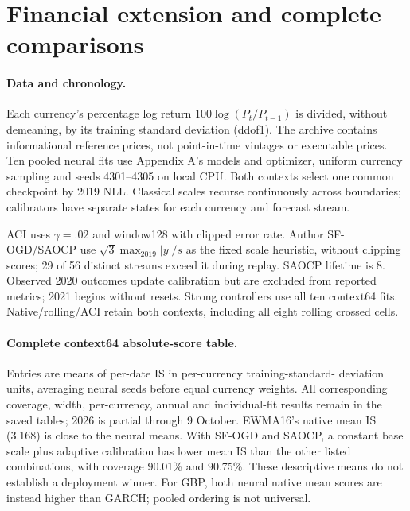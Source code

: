 \documentclass{article}
\begin{document}
\clearpage
\section{Financial extension and complete comparisons}
\paragraph{Data and chronology.}
Each currency's percentage log return $100\log(P_t/P_{t-1})$ is divided,
without demeaning, by its training standard deviation (ddof1). The archive
contains informational reference prices, not point-in-time vintages or
executable prices. Ten pooled neural fits use Appendix A's models and
optimizer, uniform currency sampling and seeds 4301--4305 on local CPU.
Both contexts select one common checkpoint by 2019 NLL. Classical scales
recurse continuously across boundaries; calibrators have separate states
for each currency and forecast stream.

ACI uses $\gamma=.02$ and window128 with clipped error rate. Author
SF-OGD/SAOCP use $\sqrt3\max_{2019}|y|/s$ as the fixed scale heuristic,
without clipping scores; 29 of 56 distinct streams exceed it during replay.
SAOCP lifetime is 8. Observed 2020 outcomes update
calibration but are excluded from reported metrics; 2021 begins without
resets. Strong controllers use all ten context64 fits. Native/rolling/ACI
retain both contexts, including all eight rolling crossed cells.

\paragraph{Complete context64 absolute-score table.}
\begin{center}
\FXFullReadout
\end{center}

\noindent Entries are means of per-date IS in per-currency training-standard-
deviation units, averaging neural seeds before equal currency weights.
All corresponding coverage, width, per-currency, annual and individual-fit
results remain in the saved tables; 2026 is partial through 9 October. EWMA16's native mean IS (3.168) is close to the neural means. With SF-OGD
and SAOCP, a constant base scale plus adaptive calibration has lower mean IS than
the other listed combinations, with coverage 90.01\% and 90.75\%. These descriptive means
do not establish a deployment winner. For GBP, both neural native mean
scores are instead higher than GARCH; pooled ordering is not universal.
\end{document}
